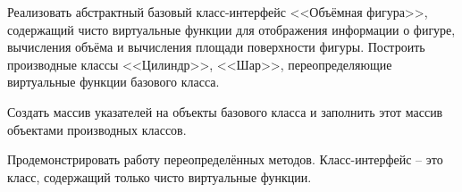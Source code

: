 Реализовать абстрактный базовый класс-интерфейс
<<Объёмная фигура>>, содержащий чисто виртуальные
функции для отображения информации о фигуре,
вычисления объёма и вычисления площади поверхности
фигуры. Построить производные классы <<Цилиндр>>, <<Шар>>,
переопределяющие виртуальные функции базового класса.

Создать массив указателей на объекты базового класса и
заполнить этот массив объектами производных классов.

Продемонстрировать работу переопределённых методов.
Класс-интерфейс – это класс, содержащий только чисто
виртуальные функции.
